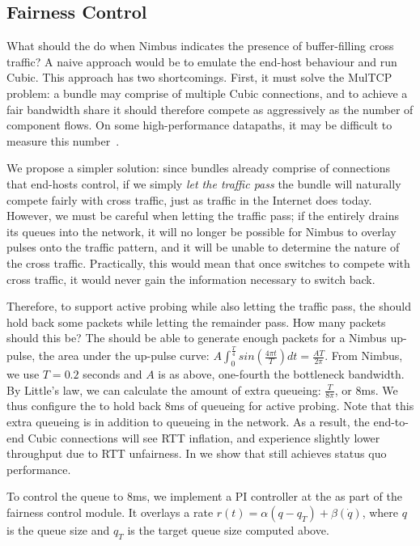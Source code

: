 \subsection{Fairness Control}\label{s:qctl:ctl}
What should the \inbox do when Nimbus indicates the presence of buffer-filling cross traffic?
A naive approach would be to emulate the end-host behaviour and run Cubic. This approach has two shortcomings.
First, it must solve the MulTCP~\cite{multcp} problem: a bundle may comprise of multiple Cubic connections, and to achieve a fair bandwidth share it should therefore compete as aggressively as the number of component flows. On some high-performance datapaths, it may be difficult to measure this number~\cite{heavy-hitters}.

We propose a simpler solution: since bundles already comprise of connections that end-hosts control, if we simply \emph{let the traffic pass} the bundle will naturally compete fairly with cross traffic, just as traffic in the Internet does today. 
However, we must be careful when letting the traffic pass; if the \inbox entirely drains its queues into the network, it will no longer be possible for Nimbus to overlay pulses onto the traffic pattern, and it will be unable to determine the nature of the cross traffic.
Practically, this would mean that once \inbox switches to compete with cross traffic, it would never gain the information necessary to switch back.

Therefore, to support active probing while also letting the traffic pass, the \inbox should hold back some packets while letting the remainder pass.
How many packets should this be? The \inbox should be able to generate enough packets for a Nimbus up-pulse, \ie the area under the up-pulse curve: 
$A \int_0^{\frac{T}{4}} sin(\frac{4\pi{}t}{T}) dt = \frac{AT}{2\pi}$.
From Nimbus, we use $T = 0.2$ seconds and $A$ is as above, one-fourth the bottleneck bandwidth. By Little's law, we can calculate the amount of extra queueing: $\frac{T}{8\pi}$, or $8$ms.
We thus configure the \inbox to hold back $8$ms of queueing for active probing.
Note that this extra queueing is in addition to queueing in the network. As a result, the end-to-end Cubic connections will see RTT inflation, and experience slightly lower throughput due to RTT unfairness. In  we show that \name still achieves status quo performance.

To control the queue to $8$ms, we implement a PI controller at the \inbox as part of the fairness control module. 
It overlays a rate $r(t) = \alpha (q - q_T) + \beta (\dot{q})$, where $q$ is the queue size and $q_T$ is the target queue size computed above.

